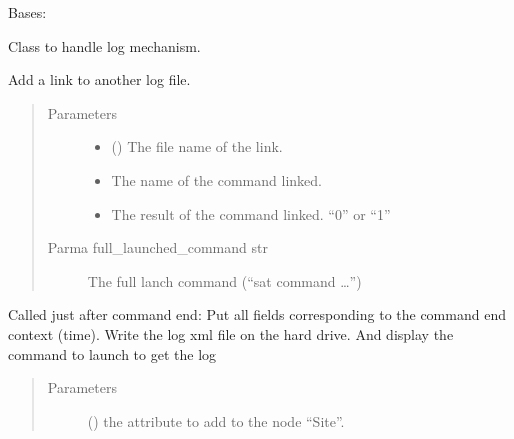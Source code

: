 \documentclass[a4paper,10pt,english]{sphinxmanual}
\begin{document}
\begin{fulllineitems}
\label{\detokenize{commands/apidoc/src:src.logger.Logger}}
Bases: 

Class to handle log mechanism.

\begin{fulllineitems}
\label{\detokenize{commands/apidoc/src:src.logger.Logger.add_link}}
Add a link to another log file.
\begin{quote}\begin{description}
\item[{Parameters}] \leavevmode\begin{itemize}
\item {} 
 () \textendash{} The file name of the link.

\item {} 
 \textendash{} The name of the command linked.

\item {} 
 \textendash{} The result of the command linked. “0” or “1”

\end{itemize}

\item[{Parma full\_launched\_command str}] \leavevmode
The full lanch command 
(“sat command …”)

\end{description}\end{quote}

\end{fulllineitems}


\begin{fulllineitems}
\label{\detokenize{commands/apidoc/src:src.logger.Logger.end_write}}
Called just after command end: Put all fields 
corresponding to the command end context (time).
Write the log xml file on the hard drive.
And display the command to launch to get the log
\begin{quote}\begin{description}
\item[{Parameters}] \leavevmode
{} () \textendash{} the attribute to add to the node “Site”.


\end{description}
\end{quote}
\end{fulllineitems}
\end{fulllineitems}
\end{document}
